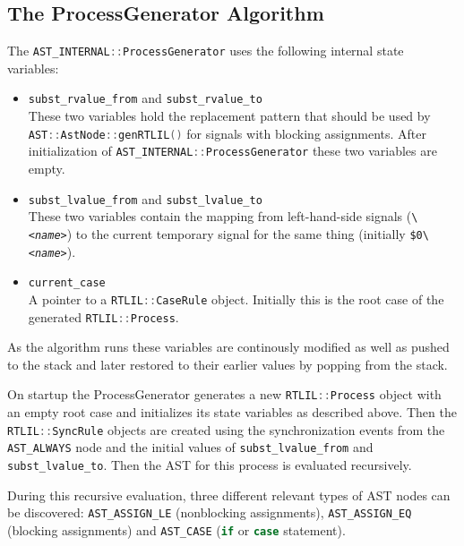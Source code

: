 \subsection{The ProcessGenerator Algorithm}

The \lstinline[language=C++]{AST_INTERNAL::ProcessGenerator} uses the following internal state variables:

\begin{itemize}
\item \begin{sloppypar}
\lstinline[language=C++]{subst_rvalue_from} and \lstinline[language=C++]{subst_rvalue_to} \\
These two variables hold the replacement pattern that should be used by \lstinline[language=C++]{AST::AstNode::genRTLIL()}
for signals with blocking assignments. After initialization of \lstinline[language=C++]{AST_INTERNAL::ProcessGenerator}
these two variables are empty.
\end{sloppypar}
%
\item \lstinline[language=C++]{subst_lvalue_from} and \lstinline[language=C++]{subst_lvalue_to} \\
These two variables contain the mapping from left-hand-side signals ({\tt \textbackslash \it <name>}) to the current
temporary signal for the same thing (initially {\tt \$0\textbackslash \it <name>}).
%
\item \lstinline[language=C++]{current_case} \\
A pointer to a \lstinline[language=C++]{RTLIL::CaseRule} object. Initially this is the root case of the
generated \lstinline[language=C++]{RTLIL::Process}.
\end{itemize}

As the algorithm runs these variables are continously modified as well as pushed
to the stack and later restored to their earlier values by popping from the stack.

On startup the ProcessGenerator generates a new
\lstinline[language=C++]{RTLIL::Process} object with an empty root case and
initializes its state variables as described above. Then the \lstinline[language=C++]{RTLIL::SyncRule} objects
are created using the synchronization events from the {\tt AST\_ALWAYS} node and the initial values of
\lstinline[language=C++]{subst_lvalue_from} and \lstinline[language=C++]{subst_lvalue_to}. Then the
AST for this process is evaluated recursively.

During this recursive evaluation, three different relevant types of AST nodes can be discovered:
{\tt AST\_ASSIGN\_LE} (nonblocking assignments), {\tt AST\_ASSIGN\_EQ} (blocking assignments) and
{\tt AST\_CASE} (\lstinline[language=Verilog]{if} or \lstinline[language=Verilog]{case} statement).

